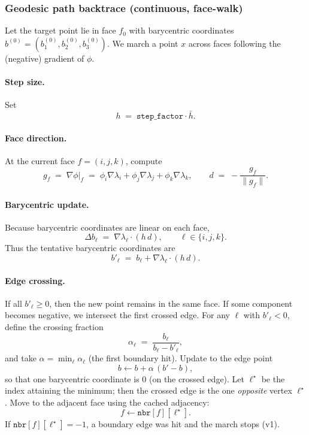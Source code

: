 \documentclass[12pt,a4paper]{article}
\theoremstyle{plain}
\theoremstyle{definition}
\begin{document}
	\subsubsection*{Geodesic path backtrace (continuous, face-walk)}
	
	Let the target point lie in face \(f_0\) with barycentric coordinates
	\(b^{(0)}=(b^{(0)}_1,b^{(0)}_2,b^{(0)}_3)\). We march a point \(x\) across faces
	following the (negative) gradient of \(\phi\).
	
	\paragraph{Step size.}
	Set
	\[
	h \;=\; \texttt{step\_factor}\cdot \bar{h}.
	\]
	
	\paragraph{Face direction.}
	At the current face \(f=(i,j,k)\), compute
	\[
	g_f \;=\; \nabla\phi\big|_f \;=\; \phi_i\nabla\lambda_i + \phi_j\nabla\lambda_j + \phi_k\nabla\lambda_k,
	\qquad
	d \;=\; -\frac{g_f}{\|g_f\|}.
	\]
	
	\paragraph{Barycentric update.}
	Because barycentric coordinates are linear on each face,
	\[
	\Delta b_\ell \;=\; \nabla\lambda_\ell \cdot (h\,d),\qquad \ell\in\{i,j,k\}.
	\]
	Thus the tentative barycentric coordinates are
	\[
	b'_\ell \;=\; b_\ell + \nabla\lambda_\ell \cdot (h\,d).
	\]
	
	\paragraph{Edge crossing.}
	If all \(b'_\ell\ge 0\), then the new point remains in the same face.
	If some component becomes negative, we intersect the first crossed edge.
	For any \(\ell\) with \(b'_\ell<0\), define the crossing fraction
	\[
	\alpha_\ell \;=\; \frac{b_\ell}{b_\ell - b'_\ell},
	\]
	and take \(\alpha=\min_\ell \alpha_\ell\) (the first boundary hit).
	Update to the edge point
	\[
	b \leftarrow b + \alpha\,(b' - b),
	\]
	so that one barycentric coordinate is \(0\) (on the crossed edge).
	Let \(\ell^\star\) be the index attaining the minimum; then the crossed edge is
	the one \emph{opposite} vertex \(\ell^\star\).
	Move to the adjacent face using the cached adjacency:
	\[
	f \leftarrow \texttt{nbr}[f][\ell^\star].
	\]
	If \(\texttt{nbr}[f][\ell^\star]=-1\), a boundary edge was hit and the march stops (v1).
	
\end{document}
